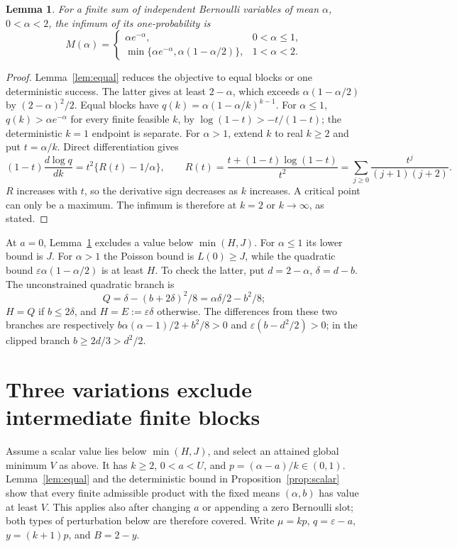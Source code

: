 \documentclass[11pt]{article}
\newtheorem{lemma}[theorem]{Lemma}
\newcommand{\eps}{\varepsilon}
\begin{document}
\begin{lemma}\label{lem:uni}
For a finite sum of independent Bernoulli variables of mean $\alpha$,
$0<\alpha<2$, the infimum of its one-probability is
\[
 M(\alpha)=\begin{cases}
 \alpha e^{-\alpha},&0<\alpha\le1,\\
 \min\{\alpha e^{-\alpha},\alpha(1-\alpha/2)\},&1<\alpha<2.
 \end{cases}
\]
\end{lemma}
\begin{proof}
Lemma~\ref{lem:equal} reduces the objective to equal blocks or one
deterministic success. The latter gives at least $2-\alpha$, which
exceeds $\alpha(1-\alpha/2)$ by $(2-\alpha)^2/2$.
Equal blocks have $q(k)=\alpha(1-\alpha/k)^{k-1}$.
For $\alpha\le1$, $q(k)>\alpha e^{-\alpha}$ for every finite feasible
$k$, by $\log(1-t)>-t/(1-t)$; the deterministic $k=1$ endpoint is
separate. For $\alpha>1$, extend $k$ to real $k\ge2$ and put
$t=\alpha/k$. Direct differentiation gives
\[
 (1-t)\frac{d\log q}{dk}=t^2\{R(t)-1/\alpha\},\qquad
 R(t)=\frac{t+(1-t)\log(1-t)}{t^2}
 =\sum_{j\ge0}\frac{t^j}{(j+1)(j+2)}.
\]
$R$ increases with $t$, so the derivative sign decreases as $k$
increases. A critical point can only be a maximum. The infimum is
therefore at $k=2$ or $k\to\infty$, as stated.
\end{proof}
At $a=0$, Lemma~\ref{lem:uni} excludes a value below $\min(H,J)$.
For $\alpha\le1$ its lower bound is $J$.
For $\alpha>1$ the Poisson bound is $L(0)\ge J$, while the quadratic
bound $\eps\alpha(1-\alpha/2)$ is at least $H$. To check the latter,
put $d=2-\alpha$, $\delta=d-b$. The unconstrained quadratic branch is
\[
 Q=\delta-(b+2\delta)^2/8=\alpha\delta/2-b^2/8;
\]
$H=Q$ if $b\le2\delta$, and $H=E:=\eps\delta$ otherwise.
The differences from these two branches are respectively
$b\alpha(\alpha-1)/2+b^2/8>0$ and
$\eps(b-d^2/2)>0$; in the clipped branch $b\ge2d/3>d^2/2$.

\section{Three variations exclude intermediate finite blocks}
Assume a scalar value lies below $\min(H,J)$, and select an attained
global minimum $V$ as above. It has $k\ge2$, $0<a<U$, and
$p=(\alpha-a)/k\in(0,1)$. Lemma~\ref{lem:equal} and the deterministic
bound in Proposition~\ref{prop:scalar} show that every finite admissible
product with the fixed means $(\alpha,b)$ has value at least $V$.
This applies also after changing $a$ or appending a zero Bernoulli slot;
both types of perturbation below are therefore covered.
Write $\mu=kp$, $q=\eps-a$, $y=(k+1)p$, and $B=2-y$.
\end{document}
